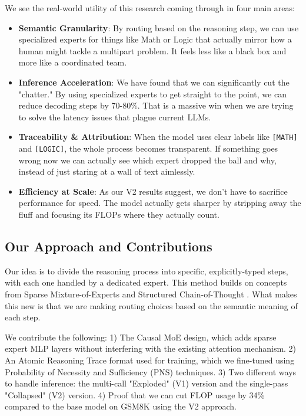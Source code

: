 \documentclass[conference,compsoc]{IEEEtran}
\begin{document}
We see the real-world utility of this research coming through in four main areas:
\begin{itemize}
    \item \textbf{Semantic Granularity}: By routing based on the reasoning step, we can use specialized experts for things like Math or Logic that actually mirror how a human might tackle a multipart problem. It feels less like a black box and more like a coordinated team.
    \item \textbf{Inference Acceleration}: We have found that we can significantly cut the "chatter." By using specialized experts to get straight to the point, we can reduce decoding steps by 70-80\%. That is a massive win when we are trying to solve the latency issues that plague current LLMs.
    \item \textbf{Traceability \& Attribution}: When the model uses clear labels like \texttt{[MATH]} and \texttt{[LOGIC]}, the whole process becomes transparent. If something goes wrong now we can actually see which expert dropped the ball and why, instead of just staring at a wall of text aimlessly.
    \item \textbf{Efficiency at Scale}: As our V2 results suggest, we don't have to sacrifice performance for speed. The model actually gets sharper by stripping away the fluff and focusing its FLOPs where they actually count.
\end{itemize}

\subsection{Our Approach and Contributions}
Our idea is to divide the reasoning process into specific, explicitly-typed steps, with each one handled by a dedicated expert. This method builds on concepts from Sparse Mixture-of-Experts \cite{b1,b3} and Structured Chain-of-Thought \cite{b4}. What makes this new is that we are making routing choices based on the semantic meaning of each step. 

We contribute the following:
1) The Causal MoE design, which adds sparse expert MLP layers without interfering with the existing attention mechanism.
2) An Atomic Reasoning Trace format used for training, which we fine-tuned using Probability of Necessity and Sufficiency (PNS) techniques.
3) Two different ways to handle inference: the multi-call "Exploded" (V1) version and the single-pass "Collapsed" (V2) version.
4) Proof that we can cut FLOP usage by 34\% compared to the base model on GSM8K using the V2 approach.
\end{document}
